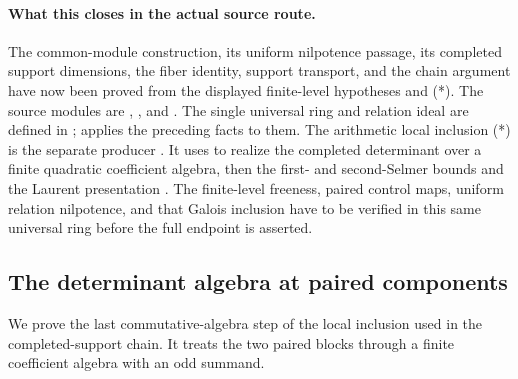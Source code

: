 \paragraph{What this closes in the actual source route.}
The common-module construction, its uniform nilpotence passage,
its completed support dimensions, the fiber identity, support
transport, and the chain argument have now been proved from the
displayed finite-level hypotheses and (*).
The source modules are
\href{https://github.com/ChristianKudeba/alpoge-rh-verification/blob/alpoge-source-7cbf7a0c/src/Development/AutomorphicArithmetic/AutomorphicVarieties/PatchingModules/AnnihilatorBaseChange/PmodEx.lean}
{},
\href{https://github.com/ChristianKudeba/alpoge-rh-verification/blob/alpoge-source-7cbf7a0c/src/Development/AutomorphicArithmetic/AutomorphicVarieties/PatchingModules/AutomorphicDetection/AnnBc.lean}
{}, and
\href{https://github.com/ChristianKudeba/alpoge-rh-verification/blob/alpoge-source-7cbf7a0c/src/Development/AutomorphicArithmetic/AutomorphicVarieties/PatchingModules/AnnihilatorBaseChange/ChainAbs.lean}
{}.
The single universal ring and relation ideal are defined in
; 
applies the preceding facts to them.
The arithmetic local inclusion (*) is the separate producer
. It uses  to realize the
completed determinant over a finite quadratic coefficient algebra,
then the first- and second-Selmer bounds and the Laurent presentation
.
The finite-level freeness, paired control maps, uniform relation
nilpotence, and that Galois inclusion have to be verified in this
same universal ring before the full  endpoint is asserted.

\subsection{The determinant algebra at paired components}
\label{sec:sr-paired-determinant-algebra}
We prove the last commutative-algebra step of the local inclusion
used in the completed-support chain. It treats the two paired blocks
through a finite coefficient algebra with an odd summand.

